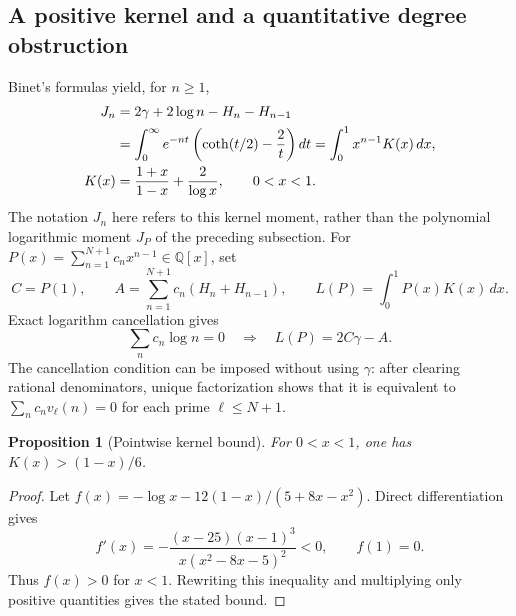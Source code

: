 \documentclass[11pt,a4paper]{article}
\newtheorem{proposition}[theorem]{Proposition}
\theoremstyle{definition}
\theoremstyle{remark}
\numberwithin{equation}{section}
\begin{document}
\subsection{A positive kernel and a quantitative degree obstruction}
\label{gamma-positive}

Binet's formulas \cite{gamma-DLMF} yield, for $n\ge1$,
\begin{align}
 J_n&=2\gamma+2\log n-H_n-H_{n-1}\notag\\
 &=\int_0^\infty e^{-nt}\left(\coth(t/2)-\frac2t\right)dt
 =\int_0^1x^{n-1}K(x)\,dx,\label{gamma-Jn}\\
 K(x)&=\frac{1+x}{1-x}+\frac2{\log x},\qquad 0<x<1.
 \notag
\end{align}
The notation $J_n$ here refers to this kernel moment, rather than the
polynomial logarithmic moment $J_P$ of the preceding subsection.
For $P(x)=\sum_{n=1}^{N+1}c_nx^{n-1}\in\mathbb Q[x]$, set
\[
 C=P(1),\qquad A=\sum_{n=1}^{N+1}c_n(H_n+H_{n-1}),
 \qquad L(P)=\int_0^1P(x)K(x)\,dx.
\]
Exact logarithm cancellation gives
\begin{equation}
 \sum_nc_n\log n=0\quad\Longrightarrow\quad L(P)=2C\gamma-A.
 \label{gamma-log-cancel}
\end{equation}
The cancellation condition can be imposed without using $\gamma$:
after clearing rational denominators, unique factorization shows that
it is equivalent to
$\sum_nc_nv_\ell(n)=0$ for each prime $\ell\le N+1$.

\begin{proposition}[Pointwise kernel bound]
\label{gamma-kernel-bound}
For $0<x<1$, one has $K(x)>(1-x)/6$.
\end{proposition}
\begin{proof}
Let $f(x)=-\log x-12(1-x)/(5+8x-x^2)$. Direct differentiation gives
\[
 f'(x)=-\frac{(x-25)(x-1)^3}{x(x^2-8x-5)^2}<0,
 \qquad f(1)=0.
\]
Thus $f(x)>0$ for $x<1$. Rewriting this inequality and multiplying
only positive quantities gives the stated bound.
\end{proof}
\end{document}
